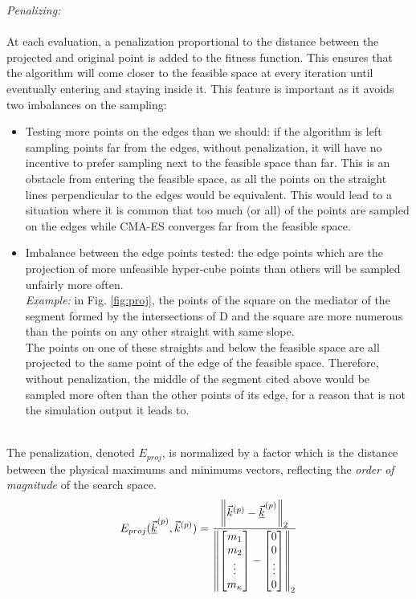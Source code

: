 \emph{Penalizing:}\\
\\
At each evaluation, a penalization proportional to the distance between the projected and original point is added to the fitness function. This ensures that the algorithm will come closer to the feasible space at every iteration until eventually entering and staying inside it. This feature is important as it avoids two imbalances on the sampling:
\begin{itemize}
	\item Testing more points on the edges than we should: if the algorithm is left sampling points far from the edges, without penalization, it will have no incentive to prefer sampling next to the feasible space than far. This is an obstacle from entering the feasible space, as all the points on the straight lines perpendicular to the edges would be equivalent. This would lead to a situation where it is common that too much (or all) of the points are sampled on the edges while CMA-ES converges far from the feasible space.
	\item Imbalance between the edge points tested: the edge points which are the projection of more unfeasible hyper-cube points than others will be sampled unfairly more often.\\
	\emph{Example:} in Fig. \ref{fig:proj}, the points of the square on the mediator of the segment formed by the intersections of D and the square are more numerous than the points on any other straight with same slope.\\
The points on one of these straights and below the feasible space are all projected to the same point of the edge of the feasible space. Therefore, without penalization, the middle of the segment cited above would be sampled more often than the other points of its edge, for a reason that is not the simulation output it leads to. 
\end{itemize}
~\\
The penalization, denoted $E_{proj}$, is normalized by a factor which is the distance between the physical maximums and minimums vectors, reflecting the \emph{order of magnitude} of the search space.
\begin{equation*}
	E_{proj}(\underline{\vec{k}}^{(p)},\vec{k}^{(p)})=\frac{\left\lVert\vec{k}^{(p)}-\underline{\vec{k}}^{(p)}\right\rVert_{2}}{\left\lVert\begin{bmatrix}m_{1}\\m_{2}\\\vdots\\m_{\kappa}\end{bmatrix}-\begin{bmatrix}0\\0\\\vdots\\0\end{bmatrix}\right\rVert_{2}}
\end{equation*}
